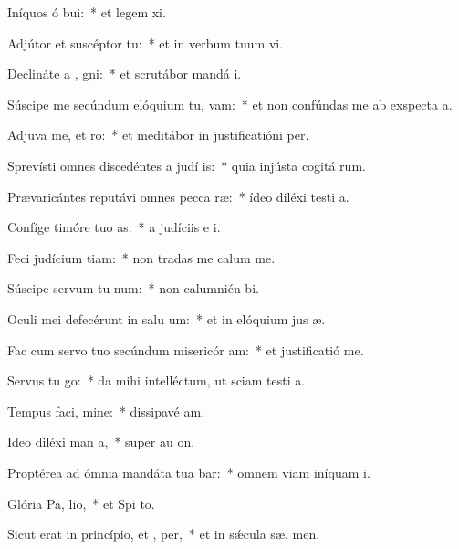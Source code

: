 \item Iníquos ó bui:~* et legem  xi.
\item Adjútor et suscéptor   tu:~* et in verbum tuum vi.
\item Declináte a , gni:~* et scrutábor mandá  i.
\item Súscipe me secúndum elóquium tu,  vam:~* et non confúndas me ab exspecta a.
\item Adjuva me, et  ro:~* et meditábor in justificatióni  per.
\item Sprevísti omnes discedéntes a judí is:~* quia injústa cogitá rum.
\item Prævaricántes reputávi omnes pecca ræ:~* ídeo diléxi testi a.
\item Confíge timóre tuo  as:~* a judíciis e  i.
\item Feci judícium  tiam:~* non tradas me calum me.
\item Súscipe servum tu  num:~* non calumnién  bi.
\item Oculi mei defecérunt in salu um:~* et in elóquium jus æ.
\item Fac cum servo tuo secúndum misericór am:~* et justificatió   me.
\item Servus tu  go:~* da mihi intelléctum, ut sciam testi a.
\item Tempus faci, mine:~* dissipavé  am.
\item Ideo diléxi man a,~* super au  on.
\item Proptérea ad ómnia mandáta tua bar:~* omnem viam iníquam  i.
\item Glória Pa,  lio,~* et Spi to.
\item Sicut erat in princípio, et ,  per,~* et in sǽcula sæ. men.

